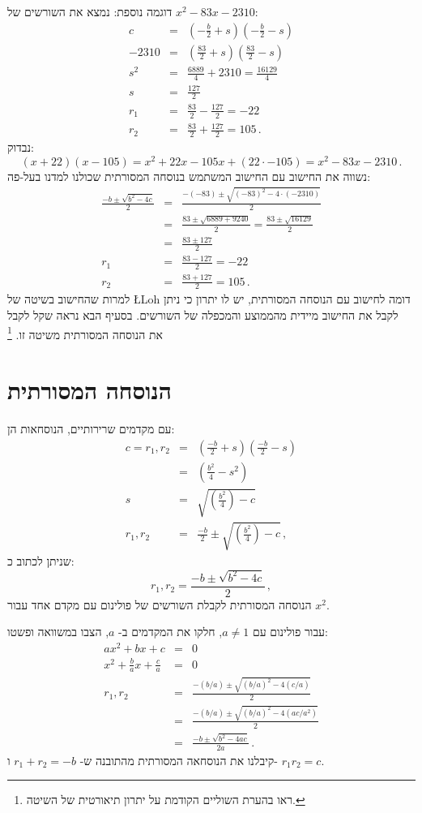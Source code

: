 \documentclass[12pt,a4paper]{article}
\begin{document}
דוגמה נוספת: נמצא את השורשים של
$x^2-83x-2310$:
\begin{eqnarray*}
c&=&\left(-\frac{b}{2} +s\right)\left(-\frac{b}{2} -s\right)\\
-2310&=&\left(\frac{83}{2}+s\right)\left(\frac{83}{2} -s\right)\\
s^2&=&\frac{6889}{4}+2310=\frac{16129}{4}\\
s&=&\frac{127}{2}\\
r_1&=&\frac{83}{2}-\frac{127}{2}=-22\\
r_2&=&\frac{83}{2}+\frac{127}{2}=105\,.
\end{eqnarray*}
נבדוק:
\[
(x+22)(x-105)=x^2+22x-105x+(22\cdot -105)= x^2-83x-2310\,.
\]
נשווה את החישוב עם החישוב המשתמש בנוסחה המסורתית שכולנו למדנו בעל-פה:
\begin{eqnarray*}
\frac{-b\pm\sqrt{b^2-4c}}{2}&=&\frac{-(-83)\pm\sqrt{(-83)^2-4\cdot (-2310)}}{2}\\
&=& \frac{83\pm\sqrt{6889+9240}}{2} = \frac{83\pm\sqrt{16129}}{2}\\
&=& \frac{83\pm 127}{2}\\
r_1&=&\frac{83-127}{2}=-22\\
r_2&=&\frac{83+127}{2}=105\,.
\end{eqnarray*}
למרות שהחישוב בשיטה של
\L{Loh}
דומה לחישוב עם הנוסחה המסורתית, יש לו יתרון כי ניתן לקבל את החישוב מיידית מהממוצע והמכפלה של השורשים. בסעיף הבא נראה שקל לקבל את הנוסחה המסורתית משיטה זו.%
\footnote{%
ראו בהערת השוליים הקודמת על יתרון תיאורטית של השיטה.%
}


\section{הנוסחה המסורתית}\label{s.general}

עם מקדמים שרירותיים, הנוסחאות הן:
\begin{eqnarray*}
c=r_1,r_2&=&\left(\frac{-b}{2}+s\right)  \left(\frac{-b}{2}-s\right)\\
&=&\left(\frac{b^2}{4}-s^2\right)\\
s&=&\sqrt{\left(\frac{b^2}{4}\right)-c}\\
r_1,r_2&=&\frac{-b}{2}\pm\sqrt{\left(\frac{b^2}{4}\right)-c}\,,
\end{eqnarray*}
שניתן לכתוב כ:
\[
r_1,r_2=\frac{-b\pm\sqrt{b^2-4c}}{2}\,,
\]
הנוסחה המסורתית לקבלת השורשים של פולינום עם מקדם אחד עבור
$x^2$.

עבור פולינום עם
$a\neq 1$, 
חלקו את המקדמים ב-%
$a$,
הצבו במשוואה ופשטו:
\begin{eqnarray*}
ax^2+bx+c&=&0\\
x^2+\frac{b}{a}x+\frac{c}{a}&=&0\\
r_1,r_2&=&\frac{-(b/a)\pm\sqrt{(b/a)^2-4(c/a)}}{2}\\
&=&\frac{-(b/a)\pm\sqrt{(b/a)^2-4(ac/a^2)}}{2}\\
&=&\frac{-b\pm\sqrt{b^2-4ac}}{2a}\,.
\end{eqnarray*}
קיבלנו את הנוסחאה המסורתית מהתובנה ש-%
$r_1+r_2=-b$
ו-%
$r_1r_2=c$.
\end{document}
